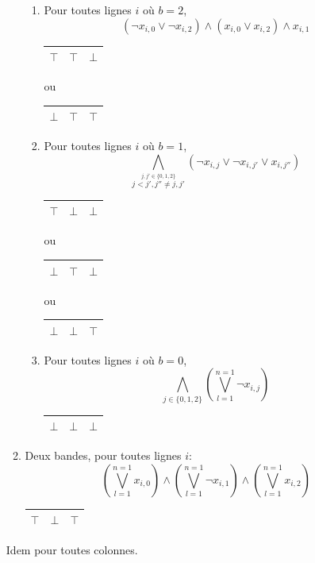\documentclass[a4paper,12pt]{report}
\begin{document}
\begin{enumerate}
\begin{enumerate}
\begin{enumerate}
			\item Pour toutes lignes $i$ où $b=2$, 
			$$(\lnot x_{i,0} \vee \lnot x_{i,2}) \wedge (x_{i,0} \vee x_{i,2}) \wedge x_{i,1}$$
			\begin{center}						
			\begin{tabular}{|c|c|c|}
			\hline 
			$\top$ & $\top$  & $\bot$  \\ 
			\hline  
			\end{tabular}
			ou
			\begin{tabular}{|c|c|c|}
			\hline 
			$\bot$ & $\top$  & $\top$  \\ 
			\hline  
			\end{tabular}
			\end{center}
			
			\item Pour toutes lignes $i$ où $b=1$, 
			$$\bigwedge_{\stackrel{j,j' \in\{0,1,2\}}{j<j', j''\neq j,j'}} (\lnot x_{i,j}\vee \lnot x_{i,j'} \vee x_{i,j''} ) $$
			\begin{center}						
			\begin{tabular}{|c|c|c|}
			\hline 
			$\top$ & $\bot$  & $\bot$  \\ 
			\hline  
			\end{tabular}
			ou
			\begin{tabular}{|c|c|c|}
			\hline 
			$\bot$ & $\top$  & $\bot$  \\ 
			\hline  
			\end{tabular}
			ou
			\begin{tabular}{|c|c|c|}
			\hline 
			$\bot$ & $\bot$  & $\top$  \\ 
			\hline  
			\end{tabular}
			\end{center}
			
			\item Pour toutes lignes $i$ où $b=0$,
			$$\bigwedge_{j\in\{0,1,2\}}\left( \bigvee_{l=1}^{n=1} \lnot x_{i,j} \right)$$
			\begin{center}						
			\begin{tabular}{|c|c|c|}
			\hline 
			$\bot$ & $\bot$  & $\bot$  \\ 
			\hline  
			\end{tabular}
			\end{center}
			
		\end{enumerate}

		\item Deux bandes, pour toutes lignes $i$:
		$$\left( \bigvee_{l=1}^{n=1} x_{i,0} \right) \wedge \left(\bigvee_{l=1}^{n=1} \lnot x_{i,1}\right) \wedge \left(\bigvee_{l=1}^{n=1} x_{i,2}\right)$$
			\begin{center}						
			\begin{tabular}{|c|c|c|}
			\hline 
			$\top$ & $\bot$  & $\top$  \\ 
			\hline  
			\end{tabular}
			\end{center}
			
	\end{enumerate}
	Idem pour toutes colonnes. 
\end{enumerate}
\end{document}
